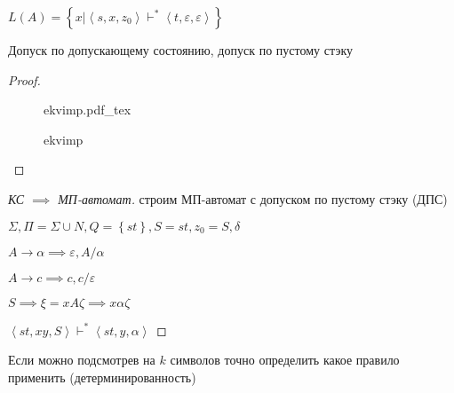 \documentclass{book}
\theoremstyle{definition}
\newcommand{\incfig}[1]{%
    \def\svgwidth{\columnwidth}
    {#1.pdf_tex}
}
\begin{document}
    \begin{definition}
        $L(A) = \left\{ x | \left<s, x, z_0 \right> \vdash^*\left<t, \varepsilon, \varepsilon \right> \right\} $
    \end{definition}

    \begin{lemma}
        Допуск по допускающему состоянию, допуск по пустому стэку
    \end{lemma}
    \begin{proof}
\begin{figure}[!ht]
    \centering
    \incfig{ekvimp}
    \caption{ekvimp}
    \label{fig:ekvimp}
\end{figure}
    \end{proof}


    \begin{proof}
        [КС $ \implies $ МП-автомат]

        строим МП-автомат с допуском по пустому стэку (ДПС)

        $\Sigma, \Pi = \Sigma \cup  N,  Q = \left\{ st \right\} , S = st, z_0 = S, \delta$

        $A \to \alpha \implies \varepsilon, A / \alpha$

        $A \to c \implies c, c / \varepsilon$

        $S \implies \xi = xA\zeta \implies x\alpha \zeta$


        $\left<st, xy, S \right> \vdash^* \left<st, y, \alpha \right>$
    \end{proof}

    \begin{definition}
        [LL(k) грамматики]

        Если можно подсмотрев на $k$ символов точно определить какое правило применить (детерминированность)
    \end{definition}
\end{document}
